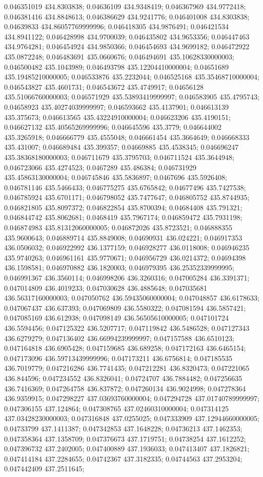 0.046351019 434.8303838; 0.04636109 434.9348419; 0.046367969 434.9772418; 0.046381416 434.8848613; 0.046386629 434.9241776; 0.046401008 434.8303838; 0.04639833 434.86057769999996; 0.046418305 434.9876491; 0.046421534 434.8941122; 0.046428998 434.9700039; 0.046435802 434.9653356; 0.046447463 434.9764281; 0.046454924 434.9850366; 0.046454693 434.9699182; 0.046472922 435.0872248; 0.046483691 435.0660676; 0.046494691 435.10628330000003; 0.046500482 435.1043989; 0.046493798 435.12204410000004; 0.04651689 435.19485210000005; 0.046533876 435.2232044; 0.046525168 435.35468710000004; 0.046543827 435.4601731; 0.046543672 435.4749917; 0.04656128 435.51066760000003; 0.046571929 435.53893419999997; 0.046583905 435.4795743; 0.04658923 435.40274039999997; 0.046593662 435.4137901; 0.046613139 435.375673; 0.046613565 435.43224910000004; 0.046623206 435.4190151; 0.046627132 435.40565269999996; 0.046645596 435.3779; 0.046644002 435.3265918; 0.046666779 435.4555048; 0.046661454 435.3664649; 0.046668333 435.431007; 0.046689484 435.399357; 0.04669885 435.4538345; 0.046696247 435.38368180000003; 0.046711679 435.3795703; 0.046711524 435.3644948; 0.046723066 435.4274523; 0.0467289 435.486384; 0.046731929 435.45863130000004; 0.046745846 435.5836897; 0.0467696 435.5926408; 0.046781146 435.5466433; 0.046775275 435.6765842; 0.04677496 435.7427538; 0.046785924 435.6701171; 0.046798052 435.7477647; 0.046805752 435.8744935; 0.046821805 435.8097372; 0.046822854 435.8700394; 0.04684408 435.791321; 0.046844742 435.8062681; 0.0468419 435.7967174; 0.046859472 435.7931198; 0.046874983 435.81312060000005; 0.046872026 435.8723521; 0.046888355 435.9600643; 0.046889714 435.8849008; 0.04690931 436.024221; 0.046917353 436.0506032; 0.046922992 436.1377159; 0.046928277 436.0118008; 0.046946235 435.9740263; 0.046961161 435.9770671; 0.046956729 436.0214372; 0.04694398 436.1598581; 0.046970882 436.1820003; 0.046979395 436.25352339999995; 0.046991367 436.3560114; 0.046998206 436.3260316; 0.047005284 436.3391371; 0.047014809 436.4019233; 0.047030628 436.4885648; 0.047035681 436.56317160000003; 0.047050762 436.59435060000004; 0.047048857 436.6178633; 0.047067437 436.637393; 0.047069809 436.5580322; 0.047081594 436.5857421; 0.047085169 436.612938; 0.047098149 436.56505610000005; 0.047101724 436.5594456; 0.047125322 436.5207717; 0.047119842 436.5486528; 0.047127343 436.6279279; 0.047136402 436.66994239999997; 0.047157588 436.6510123; 0.047164818 436.6905428; 0.047159685 436.689258; 0.047172163 436.6465154; 0.047173096 436.59713439999996; 0.047173211 436.6756814; 0.047185535 436.7019779; 0.047216286 436.7741435; 0.047212281 436.8320473; 0.047221065 436.844596; 0.047234552 436.8326041; 0.04724707 436.7884482; 0.047256635 436.7416369; 0.047264758 436.837872; 0.047260134 436.9024998; 0.047278364 436.9359915; 0.047298227 437.03693760000004; 0.047294728 437.01740789999997; 0.047306155 437.124864; 0.047308765 437.02460310000004; 0.047314125 437.03428230000003; 0.047316848 437.0255025; 0.047333909 437.12944660000005; 0.04733799 437.1411387; 0.047342853 437.1648228; 0.04736213 437.1462353; 0.047358364 437.1358709; 0.047376673 437.1719751; 0.04738254 437.1612252; 0.047396732 437.2402005; 0.047400889 437.1936033; 0.047413407 437.1826821; 0.047414184 437.2284655; 0.04742367 437.3182335; 0.04744563 437.2953204; 0.047442409 437.2511645; 
